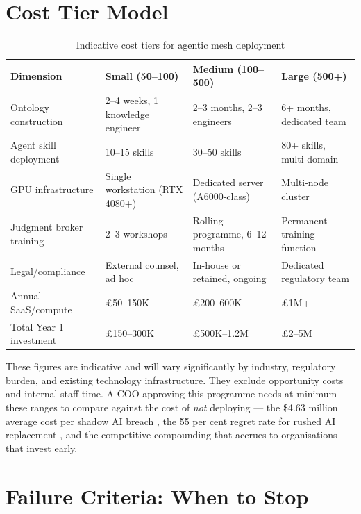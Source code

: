 \section{Cost Tier Model}

\begin{table}[H]
\centering
\caption{Indicative cost tiers for agentic mesh deployment}
\label{tab:cost-tiers}
\begin{tabularx}{\textwidth}{l C{2.2cm} C{2.2cm} X}
\toprule
\textbf{Dimension} & \textbf{Small (50--100)} & \textbf{Medium (100--500)} & \textbf{Large (500+)} \\
\midrule
Ontology construction & 2--4 weeks, 1 knowledge engineer & 2--3 months, 2--3 engineers & 6+ months, dedicated team \\
\addlinespace
Agent skill deployment & 10--15 skills & 30--50 skills & 80+ skills, multi-domain \\
\addlinespace
GPU infrastructure & Single workstation (RTX 4080+) & Dedicated server (A6000-class) & Multi-node cluster \\
\addlinespace
Judgment broker training & 2--3 workshops & Rolling programme, 6--12 months & Permanent training function \\
\addlinespace
Legal/compliance & External counsel, ad hoc & In-house or retained, ongoing & Dedicated regulatory team \\
\addlinespace
Annual SaaS/compute & \pounds 50--150K & \pounds 200--600K & \pounds 1M+ \\
\addlinespace
Total Year 1 investment & \pounds 150--300K & \pounds 500K--1.2M & \pounds 2--5M \\
\bottomrule
\end{tabularx}
\end{table}

These figures are indicative and will vary significantly by industry, regulatory burden, and existing technology infrastructure. They exclude opportunity costs and internal staff time. A COO approving this programme needs at minimum these ranges to compare against the cost of \emph{not} deploying --- the \$4.63 million average cost per shadow AI breach \parencite{IBM2025}, the 55 per cent regret rate for rushed AI replacement \parencite{OrgvueForrester2025}, and the competitive compounding that accrues to organisations that invest early.

\section{Failure Criteria: When to Stop}

